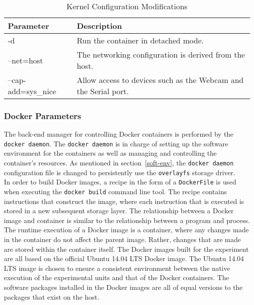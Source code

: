 \begin{table}[]
\begin{tabular}{|l|l|}
\hline
\textbf{Parameter}  & \textbf{Description}                                            \\ \hline
-d                  & Run the container in detached mode.                             \\ \hline
--net=host          & The networking configuration is derived from the host.          \\ \hline
--cap-add=sys\_nice & Allow access to devices such as the Webcam and the Serial port. \\ \hline
\end{tabular}
\centering
\caption{Kernel Configuration Modifications}
\label{kernel-config}
\end{table}


\subsubsection{Docker Parameters} 
The back-end manager for controlling Docker containers is performed by the \texttt{docker daemon}. The \texttt{docker daemon} is in charge of setting up the software environment for the containers as well as managing and controlling the container's resources. As mentioned in section~\ref{soft-env}, the \texttt{docker daemon} configuration file is changed to persistently use the \texttt{overlayfs} storage driver.\\

In order to build Docker images, a recipe in the form of a \texttt{DockerFile} is used when executing the \texttt{docker build} command line tool. The recipe contains instructions that construct the image, where each instruction that is executed is stored in a new subsequent storage layer. The relationship between a Docker image and container is similar to the relationship between a program and process. The runtime execution of a Docker image is a container, where any changes made in the container do not affect the parent image. Rather, changes that are made are stored within the container itself. The Docker images built for the experiment are all based on the official Ubuntu 14.04 LTS Docker image. The Ubuntu 14.04 LTS image is chosen to ensure a consistent environment between the native execution of the experimental units and that of the Docker containers. The software packages installed in the Docker images are all of equal versions to the packages that exist on the host. \\

